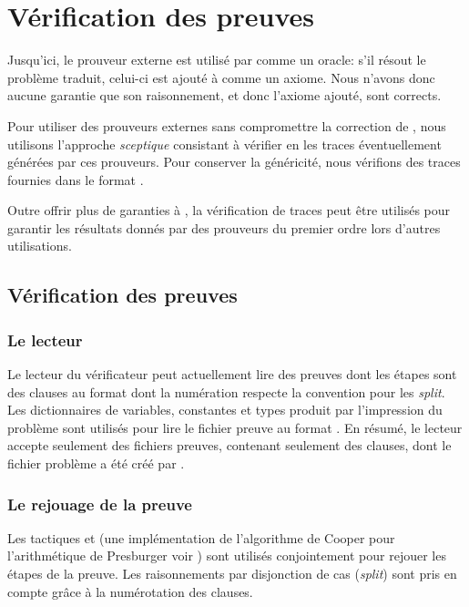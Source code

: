 \section{Vérification des preuves \tff}
\label{sec:traces}

Jusqu'ici, le prouveur externe est utilisé par \holfour comme un
oracle: s'il résout le problème traduit, celui-ci est ajouté à \holfour
comme un axiome. Nous n'avons donc aucune garantie que son raisonnement,
et donc l'axiome ajouté, sont corrects.

Pour utiliser des prouveurs externes sans compromettre la correction de
\holfour, nous utilisons l'approche \emph{sceptique} consistant à
vérifier en \holfour les traces éventuellement générées par ces
prouveurs. Pour conserver la généricité, nous vérifions des traces
fournies dans le format \tff.

Outre offrir plus de garanties à \holfour, la vérification de traces
\tff peut être utilisés pour garantir les résultats donnés par des
prouveurs du premier ordre lors d'autres utilisations.


\subsection{Vérification des preuves}

\subsubsection{Le lecteur}
Le lecteur du vérificateur peut actuellement lire des preuves dont les étapes sont des clauses au format \tff dont la numération respecte la convention \tff pour les \textit{split}. Les dictionnaires de variables, constantes et types produit par l'impression du problème sont utilisés pour lire le fichier preuve au format \tff. En résumé, le lecteur accepte seulement des fichiers preuves, contenant seulement des clauses, dont le fichier problème a été créé par \holfour.

\subsubsection{Le rejouage de la preuve}
Les tactiques \metistac et \coopertac (une implémentation de l'algorithme de Cooper pour l'arithmétique de Presburger voir \cite{Norrish03completeinteger})
sont utilisés conjointement pour rejouer les étapes de la preuve. 
Les raisonnements par disjonction de cas (\textit{split}) sont pris en compte grâce à la numérotation des clauses.


